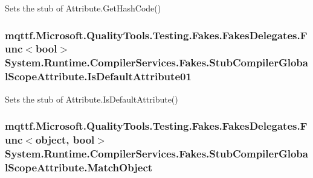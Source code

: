 Sets the stub of Attribute.\-Get\-Hash\-Code()

\hypertarget{class_system_1_1_runtime_1_1_compiler_services_1_1_fakes_1_1_stub_compiler_global_scope_attribute_ae893e4a24454726d4aba5b2ed234c724}{
\subsubsection[{Is\-Default\-Attribute01}]{\setlength{\rightskip}{0pt plus 5cm}mqttf.\-Microsoft.\-Quality\-Tools.\-Testing.\-Fakes.\-Fakes\-Delegates.\-Func$<$bool$>$ System.\-Runtime.\-Compiler\-Services.\-Fakes.\-Stub\-Compiler\-Global\-Scope\-Attribute.\-Is\-Default\-Attribute01}}\label{class_system_1_1_runtime_1_1_compiler_services_1_1_fakes_1_1_stub_compiler_global_scope_attribute_ae893e4a24454726d4aba5b2ed234c724}


Sets the stub of Attribute.\-Is\-Default\-Attribute()

\hypertarget{class_system_1_1_runtime_1_1_compiler_services_1_1_fakes_1_1_stub_compiler_global_scope_attribute_ab7cc1093ee2e79627b9c674f2fe32c0a}{
\subsubsection[{Match\-Object}]{\setlength{\rightskip}{0pt plus 5cm}mqttf.\-Microsoft.\-Quality\-Tools.\-Testing.\-Fakes.\-Fakes\-Delegates.\-Func$<$object, bool$>$ System.\-Runtime.\-Compiler\-Services.\-Fakes.\-Stub\-Compiler\-Global\-Scope\-Attribute.\-Match\-Object}}\label{class_system_1_1_runtime_1_1_compiler_services_1_1_fakes_1_1_stub_compiler_global_scope_attribute_ab7cc1093ee2e79627b9c674f2fe32c0a}


